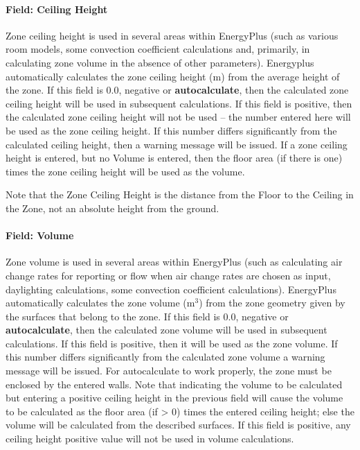\paragraph{Field: Ceiling Height}\label{field-ceiling-height}

Zone ceiling height is used in several areas within EnergyPlus (such as various room models, some convection coefficient calculations and, primarily, in calculating zone volume in the absence of other parameters). Energyplus automatically calculates the zone ceiling height (m) from the average height of the zone. If this field is 0.0, negative or \textbf{autocalculate}, then the calculated zone ceiling height will be used in subsequent calculations. If this field is positive, then the calculated zone ceiling height will not be used -- the number entered here will be used as the zone ceiling height. If this number differs significantly from the calculated ceiling height, then a warning message will be issued. If a zone ceiling height is entered, but no Volume is entered, then the floor area (if there is one) times the zone ceiling height will be used as the volume.

Note that the Zone Ceiling Height is the distance from the Floor to the Ceiling in the Zone, not an absolute height from the ground.

\paragraph{Field: Volume}\label{field-volume}

Zone volume is used in several areas within EnergyPlus (such as calculating air change rates for reporting or flow when air change rates are chosen as input, daylighting calculations, some convection coefficient calculations). EnergyPlus automatically calculates the zone volume (m\(^{3}\)) from the zone geometry given by the surfaces that belong to the zone. If this field is 0.0, negative or \textbf{autocalculate}, then the calculated zone volume will be used in subsequent calculations. If this field is positive, then it will be used as the zone volume. If this number differs significantly from the calculated zone volume a warning message will be issued. For autocalculate to work properly, the zone must be enclosed by the entered walls. Note that indicating the volume to be calculated but entering a positive ceiling height in the previous field will cause the volume to be calculated as the floor area (if \textgreater{} 0) times the entered ceiling height; else the volume will be calculated from the described surfaces. If this field is positive, any ceiling height positive value will not be used in volume calculations.

